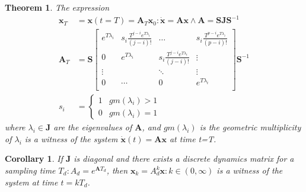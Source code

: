 \documentclass[twocolumn]{autart}    %
\newcommand{\mat}[1]{\boldsymbol{#1}}
\renewcommand{\vec}[1]{\boldsymbol{#1}}
\newtheorem{theorem}{Theorem}
\newtheorem{corollary}{Corollary}
\begin{document}
 \begin{theorem}
 The expression
 \begin{align}
 \vec{x}_T&=\vec{x}(t=T)=\mat{A}_{T}\vec{x}_0 : \dot{\vec{x}}=\mat{A}\vec{x} \wedge \mat{A}=\mat{S}\mat{J}\mat{S}^{-1}\nonumber\\
 \mat{A}_{T}&= \mat{S}
 \left [ \begin{array}{cccc}
 e^{T\lambda_i}  & s_i\frac{T^{j-i}e^{T\lambda_i}}{(j-i)!} & \hdots  & s_i\frac{T^{p-i}e^{T\lambda_i}}{(p-i)!} \\
0 & e^{T\lambda_i}  & s_i\frac{T^{j-i}e^{T\lambda_i}}{(j-i)!} & \vdots \\
\vdots & & \ddots & \vdots \\
0 & \cdots & 0  &e^{T\lambda_i} \\
\end{array} \right ]
 \mat{S}^{-1}\nonumber\\
 s_i&=\left\{\begin{array}{cc}1&gm(\lambda_i)>1\\0&gm(\lambda_i)=1\end{array}\right.
 \label{eq:continuous_tube_dyn}
 \end{align}
 where $\lambda_i \in \mat{J}$ are the eigenvalues of $\mat{A}$, and $gm(\lambda_i)$ is the geometric multiplicity of $\lambda_i$ is a witness of the system $\dot{\vec{x}}(t)=\mat{A}\vec{x}$ at time t=T.
 \end{theorem}
 \begin{corollary}
 If $\mat{J}$ is diagonal and there exists a discrete dynamics matrix for a sampling time $T_d :  A_d=e^{\mat{A} T_d}$, then $\vec{x}_k=A_d^k\vec{x} : k \in (0,\infty)$ is a witness of the system at time $t=kT_d$.
 \end{corollary}
\end{document}
